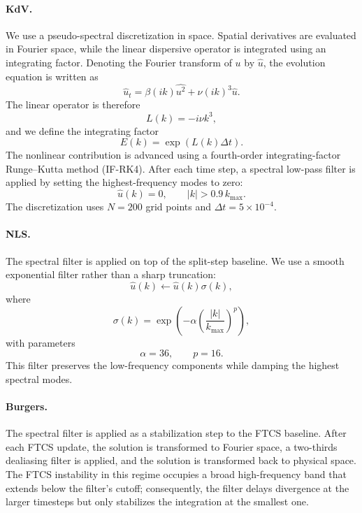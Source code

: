 \documentclass[letterpaper]{article} %
\begin{document}
\paragraph{KdV.}
We use a pseudo-spectral discretization in space.
Spatial derivatives are evaluated in Fourier space, while the linear dispersive
operator is integrated using an integrating factor. Denoting the Fourier
transform of $u$ by $\hat u$, the evolution equation is written as
\[
\hat u_t
=
\beta(ik)\widehat{u^2}
+
\nu(ik)^3\hat u .
\]
The linear operator is therefore
\[
L(k)=-i\nu k^3,
\]
and we define the integrating factor
\[
E(k)=\exp(L(k)\Delta t).
\]
The nonlinear contribution is advanced using a fourth-order integrating-factor
Runge--Kutta method (IF-RK4). After each time step, a spectral low-pass filter
is applied by setting the highest-frequency modes to zero:
\[
\hat u(k)=0,
\qquad
|k|>0.9\,k_{\max}.
\]
The discretization uses $N=200$ grid points and
$\Delta t=5\times10^{-4}$.

\paragraph{NLS.}
The spectral filter is applied on top
of the split-step baseline. We use a smooth
exponential filter rather than a sharp truncation:
\[
\hat u(k)\leftarrow \hat u(k)\sigma(k),
\]
where
\[
\sigma(k)=
\exp\left(
-\alpha
\left(
\frac{|k|}{k_{\max}}
\right)^p
\right),
\]
with parameters
\[
\alpha=36,
\qquad
p=16.
\]
This filter preserves the low-frequency components while damping the highest
spectral modes.

\paragraph{Burgers.}
The spectral filter is applied as a stabilization step
to the FTCS baseline. After each FTCS update, the solution is transformed to
Fourier space, a two-thirds dealiasing filter is applied, and the solution is
transformed back to physical space. The FTCS instability in this regime
occupies a broad high-frequency band that extends below the filter's cutoff;
consequently, the filter delays divergence at the larger timesteps but only
stabilizes the integration at the smallest one.


\end{document}
